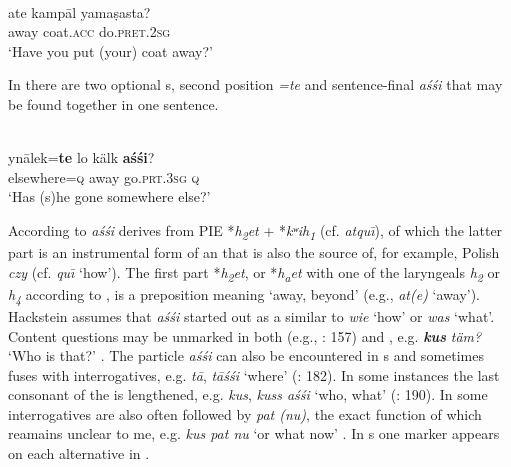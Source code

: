 \ea%
    \label{ex:indo:36}
    \\
    \gll ate  kamp\=al    yamaṣasta?\\
    away  coat.\textsc{acc}  do.\textsc{pret}.2\textsc{sg}\\
    \glt ‘Have you put (your) coat away?’ \citep[110]{Hackstein2013}
    \z

In  there are two optional s, second position \textit{=te} and sentence-final \textit{aśśi} that may be found together in one sentence.

\ea%
    \label{ex:indo:37}
    \\
    \gll yn\=alek=\textbf{{te}} lo  kälk \textbf{{aśśi}}?\\
    elsewhere=\textsc{q}  away  go.\textsc{prt}.3\textsc{sg}  \textsc{q}\\
    \glt ‘Has (s)he gone somewhere else?’ \citep[111]{Hackstein2013}
    \z

\noindent According to \citet[175]{Hackstein2004} \textit{aśśi} derives from PIE *\textit{h\textsubscript{2}}\textit{et} + *\textit{kʷ}\textit{ih\textsubscript{1}} (cf.  \textit{atqu\={\i}}), of which the latter part is an instrumental form of an  that is also the source of, for example, Polish \textit{czy} (cf.  \textit{qu\={\i}} ‘how’). The first part *\textit{h\textsubscript{2}}\textit{et}, or *\textit{h\textsubscript{a}}\textit{et} with one of the laryngeals \textit{h\textsubscript{2}} or \textit{h\textsubscript{4}} according to \cite[289ff.]{MalloryAdams2006}, is a preposition meaning ‘away, beyond’ (e.g.,  \textit{at(e)} ‘away’). Hackstein assumes that \textit{aśśi} started out as a  similar to  \textit{wie} ‘how’ or \textit{was} ‘what’. Content questions may be unmarked in both  (e.g., \citealt{Adams2013}: 157) and , e.g. \textbf{\textit{kus}} \textit{täm?} ‘Who is that?’ \citep[156]{Carling2009}. The particle \textit{aśśi} can also be encountered in s and sometimes fuses with interrogatives, e.g. \textit{t\=a}, \textit{t\=aśśi} ‘where’ (\citealt{SiegSiegling1931}: 182). In some instances the last consonant of the  is lengthened, e.g. \textit{kus}, \textit{kuss aśśi} ‘who, what’ (\citealt{SiegSiegling1931}: 190). In  some interrogatives are also often followed by \textit{pat (nu)}, the exact function of which reamains unclear to me, e.g. \textit{kus pat nu} ‘or what now’ \citep[156]{Carling2009}. In s one marker appears on each alternative in .

